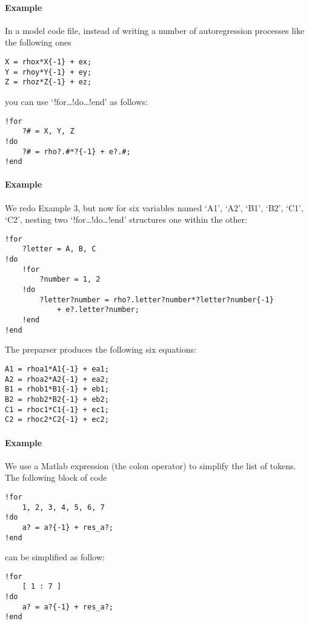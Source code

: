 \paragraph{Example}

In a model code file, instead of writing a number of autoregression
processes like the following ones

\begin{verbatim}
X = rhox*X{-1} + ex;
Y = rhoy*Y{-1} + ey;
Z = rhoz*Z{-1} + ez;
\end{verbatim}

you can use `!for\ldots{}!do\ldots{}!end' as follows:

\begin{verbatim}
!for
    ?# = X, Y, Z
!do
    ?# = rho?.#*?{-1} + e?.#;
!end
\end{verbatim}

\paragraph{Example}

We redo Example 3, but now for six variables named `A1', `A2', `B1',
`B2', `C1', `C2', nesting two `!for\ldots{}!do\ldots{}!end' structures
one within the other:

\begin{verbatim}
!for
    ?letter = A, B, C
!do
    !for
        ?number = 1, 2
    !do
        ?letter?number = rho?.letter?number*?letter?number{-1}
            + e?.letter?number;
    !end
!end
\end{verbatim}

The preparser produces the following six equations:

\begin{verbatim}
A1 = rhoa1*A1{-1} + ea1;
A2 = rhoa2*A2{-1} + ea2;
B1 = rhob1*B1{-1} + eb1;
B2 = rhob2*B2{-1} + eb2;
C1 = rhoc1*C1{-1} + ec1;
C2 = rhoc2*C2{-1} + ec2;
\end{verbatim}

\paragraph{Example}

We use a Matlab expression (the colon operator) to simplify the list of
tokens. The following block of code

\begin{verbatim}
!for
    1, 2, 3, 4, 5, 6, 7
!do
    a? = a?{-1} + res_a?;
!end
\end{verbatim}

can be simplified as follow:

\begin{verbatim}
!for
    [ 1 : 7 ]
!do
    a? = a?{-1} + res_a?;
!end
\end{verbatim}


